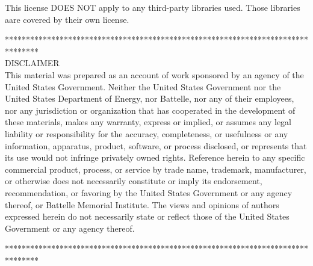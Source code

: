 This license DOES NOT apply to any third-party libraries used. Those libraries aare covered by their own license.


\noindent
\newpage
********************************************************************************\\
\noindent
DISCLAIMER \\

\noindent
This material was prepared as an account of work sponsored by an agency of the United States Government.  Neither the United States Government nor the United States Department of Energy, nor Battelle, nor any of their employees, nor any jurisdiction or organization that has cooperated in the development of these materials, makes any warranty, express or implied, or assumes any legal liability or responsibility for the accuracy, completeness, or usefulness or any information, apparatus, product, software, or process disclosed, or represents that its use would not infringe privately owned rights.
Reference herein to any specific commercial product, process, or service by trade name, trademark, manufacturer, or otherwise does not necessarily constitute or imply its endorsement, recommendation, or favoring by the United States Government or any agency thereof, or Battelle Memorial Institute. The views and opinions of authors expressed herein do not necessarily state or reflect those of the United States Government or any agency thereof.

\noindent
********************************************************************************\\
